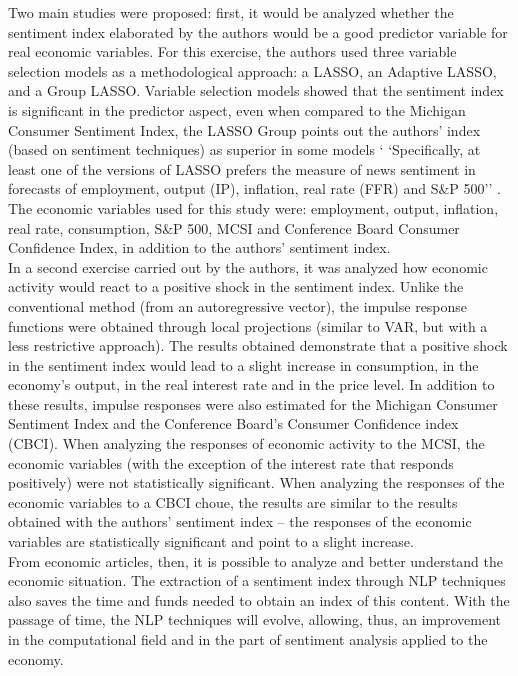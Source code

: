 Two main studies were proposed: first, it would be analyzed whether the sentiment index elaborated by the authors would be a good predictor variable for real economic variables. For this exercise, the authors used three variable selection models as a methodological approach: a LASSO, an Adaptive LASSO, and a Group LASSO. Variable selection models showed that the sentiment index is significant in the predictor aspect, even when compared to the Michigan Consumer Sentiment Index, the LASSO Group points out the authors' index (based on sentiment techniques) as superior in some models ` `Specifically, at least one of the versions of LASSO prefers the measure of news sentiment in forecasts of employment, output (IP), inflation, real rate (FFR) and S\&P 500'' \cite[p. 26]{shapiro2020measurement}. The economic variables used for this study were: employment, output, inflation, real rate, consumption, S\&P 500, MCSI and Conference Board Consumer Confidence Index, in addition to the authors' sentiment index.\\
In a second exercise carried out by the authors, it was analyzed how economic activity would react to a positive shock in the sentiment index. Unlike the conventional method (from an autoregressive vector), the impulse response functions were obtained through local projections \cite{jorda2005estimation} (similar to VAR, but with a less restrictive approach). The results obtained demonstrate that a positive shock in the sentiment index would lead to a slight increase in consumption, in the economy's output, in the real interest rate and in the price level. In addition to these results, impulse responses were also estimated for the Michigan Consumer Sentiment Index and the Conference Board's Consumer Confidence index (CBCI). When analyzing the responses of economic activity to the MCSI, the economic variables (with the exception of the interest rate that responds positively) were not statistically significant. When analyzing the responses of the economic variables to a CBCI choue, the results are similar to the results obtained with the authors' sentiment index -- the responses of the economic variables are statistically significant and point to a slight increase.\\

From economic articles, then, it is possible to analyze and better understand the economic situation. The extraction of a sentiment index through NLP techniques also saves the time and funds needed to obtain an index of this content. With the passage of time, the NLP techniques will evolve, allowing, thus, an improvement in the computational field and in the part of sentiment analysis applied to the economy.\\


